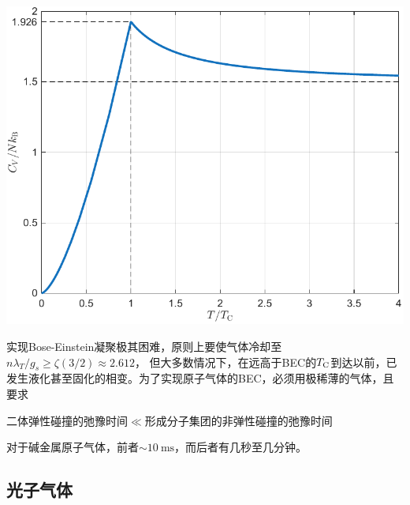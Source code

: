 \begin{center}
	\includegraphics[width=0.7\linewidth]{figures/C_VBoson.pdf}
\end{center}

\begin{remark}
	
	实现Bose-Einstein凝聚极其困难，原则上要使气体冷却至
	$n\lambda_T/g_s\geq\zeta(3/2)\approx 2.612$，
	但大多数情况下，在远高于BEC的$T_{\mathrm{C}}$到达以前，已发生液化甚至固化的相变。为了实现原子气体的BEC，必须用极稀薄的气体，且要求
	\begin{center}
		二体弹性碰撞的弛豫时间$\ll$形成分子集团的非弹性碰撞的弛豫时间
	\end{center}
	对于碱金属原子气体，前者$\sim\SI{10}\ms$，而后者有几秒至几分钟。%
	
\end{remark}




\subsection{光子气体}

